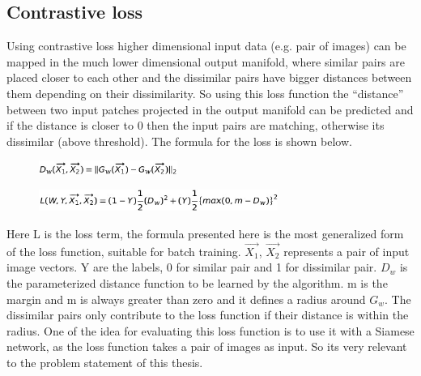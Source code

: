 \newpage
\subsection{Contrastive loss}
Using contrastive loss higher dimensional input data (e.g. pair of images) can be mapped in the much lower dimensional output manifold, where similar pairs are placed closer to each other and 
the dissimilar pairs have bigger distances between them depending on their dissimilarity.  So using this loss function the “distance” between two input patches projected in the output manifold can be 
predicted and if the distance is closer to 0 then the input pairs are matching, otherwise its dissimilar (above threshold). The formula for the loss is shown below. 
\begin{figure}[ht]
\centering
\includegraphics[height= 0.45cm]{images/contrastive/contrastive_loss_formula1.jpg}%
\label{fig:contrastive_loss_formula1}
\end{figure}

\begin{figure}[ht]
\centering
\includegraphics[height= 0.7cm]{images/contrastive/contrastive_loss_formula2.jpg}
\label{fig:contrastive_loss_formula2}
\end{figure}

Here L is the loss term, the formula presented here is the most generalized form of the loss function, suitable for batch training. 
$ \vec{X_1}$, $ \vec{X_2}$ represents a pair of input image vectors. Y are the labels, 0 for similar pair and 1 for dissimilar pair. $D_w$ is the parameterized distance function to be learned by the algorithm. 
m is the margin and m is always greater than zero and it defines a radius around $G_w$. The dissimilar pairs only contribute to the loss function if their distance is within the radius.
One of the idea for evaluating this loss function is to use it with a Siamese network, as the loss function takes a pair of images as input. So its very relevant to the problem statement of this thesis. 

